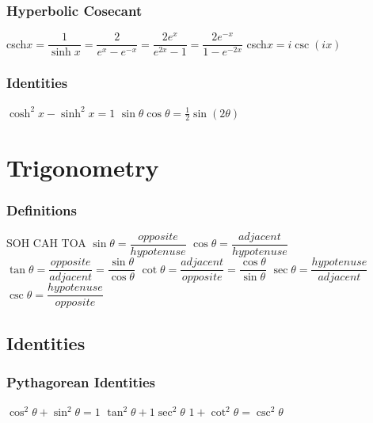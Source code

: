 \subsubsection{Hyperbolic Cosecant}	
\begin{itemize}
\itemt csch\(x = \dfrac{1}{\sinh x} = \dfrac{2}{e^x - e^{-x}} = \dfrac{2e^x}{e^{2x}-1} = \dfrac{2e^{-x}}{1-e^{-2x}} \)
\itemt csch\(x = i\csc(ix) \)
\end{itemize}				

\subsubsection{Identities}			
\begin{itemize}
\itemt \( \cosh^2x - \sinh^2x = 1 \)
\itemt \( \sin\theta \cos\theta = \frac{1}{2}\sin(2\theta) \)
\end{itemize}
			

	\section{Trigonometry}


\subsubsection{Definitions}
\begin{itemize}
\itemt SOH CAH TOA
\itemt \( \sin\theta = \dfrac{opposite}{hypotenuse} \)
\itemt \( \cos\theta = \dfrac{adjacent}{hypotenuse} \)
\itemt \( \tan\theta = \dfrac{opposite}{adjacent} = \dfrac{\sin\theta}{\cos\theta} \)
\itemt \( \cot\theta = \dfrac{adjacent}{opposite} = \dfrac{\cos\theta}{\sin\theta} \)
\itemt \( \sec\theta = \dfrac{hypotenuse}{adjacent} \)
\itemt \( \csc\theta = \dfrac{hypotenuse}{opposite} \)
\end{itemize}

\subsection{Identities}

\subsubsection{Pythagorean Identities}
\begin{itemize}
\itemt \( \cos^2\theta+\sin^2\theta = 1 \)
\itemt \( \tan^2\theta + 1 \sec^2 \theta \)
\itemt \( 1 + \cot^2 \theta = \csc^2 \theta \)

\end{itemize}

